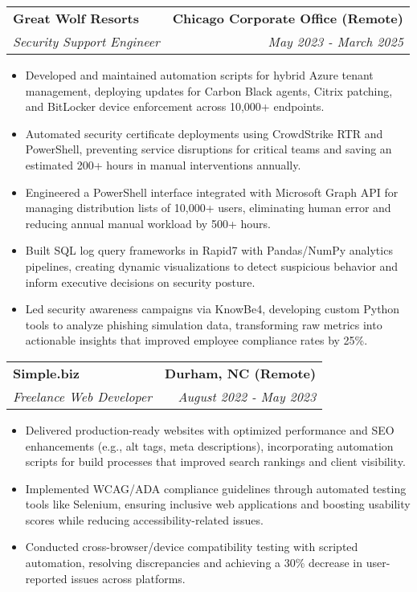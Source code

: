\documentclass[letterpaper,10pt]{article}
\makeatletter
\newcommand{\resumeItem}[1]{\item\small{#1}}
\newcommand{\resumeItemListStart}{\begin{itemize}}
\newcommand{\resumeItemListEnd}{\end{itemize}\vspace{-2pt}}
\newcommand{\resumeSubheading}[4]{%
  \vspace{-2pt}\item
  \begin{tabular*}{\textwidth}[t]{l@{\extracolsep{\fill}}r}
    \textbf{\large #1} & \textbf{\small #2} \\
    \textit{\large #3} & \textit{\small #4} \\
  \end{tabular*}\vspace{-2pt}
}
\makeatother
\begin{document}
\resumeSubheading
  {Great Wolf Resorts}{Chicago Corporate Office (Remote)}
  {Security Support Engineer}{May 2023 - March 2025}
\vspace{2pt}
\resumeItemListStart
  \resumeItem{Developed and maintained automation scripts for hybrid Azure tenant management, deploying updates for Carbon Black agents, Citrix patching, and BitLocker device enforcement across 10,000+ endpoints.}
  \resumeItem{Automated security certificate deployments using CrowdStrike RTR and PowerShell, preventing service disruptions for critical teams and saving an estimated 200+ hours in manual interventions annually.}
  \resumeItem{Engineered a PowerShell interface integrated with Microsoft Graph API for managing distribution lists of 10,000+ users, eliminating human error and reducing annual manual workload by 500+ hours.}
  \resumeItem{Built SQL log query frameworks in Rapid7 with Pandas/NumPy analytics pipelines, creating dynamic visualizations to detect suspicious behavior and inform executive decisions on security posture.}
  \resumeItem{Led security awareness campaigns via KnowBe4, developing custom Python tools to analyze phishing simulation data, transforming raw metrics into actionable insights that improved employee compliance rates by 25\%.}
\resumeItemListEnd
\vspace{6pt}
\resumeSubheading
  {Simple.biz}{Durham, NC (Remote)}
  {Freelance Web Developer}{August 2022 - May 2023}
\vspace{2pt}
\resumeItemListStart
  \resumeItem{Delivered production-ready websites with optimized performance and SEO enhancements (e.g., alt tags, meta descriptions), incorporating automation scripts for build processes that improved search rankings and client visibility.}
  \resumeItem{Implemented WCAG/ADA compliance guidelines through automated testing tools like Selenium, ensuring inclusive web applications and boosting usability scores while reducing accessibility-related issues.}
  \resumeItem{Conducted cross-browser/device compatibility testing with scripted automation, resolving discrepancies and achieving a 30\% decrease in user-reported issues across platforms.}
\resumeItemListEnd
\end{document}
